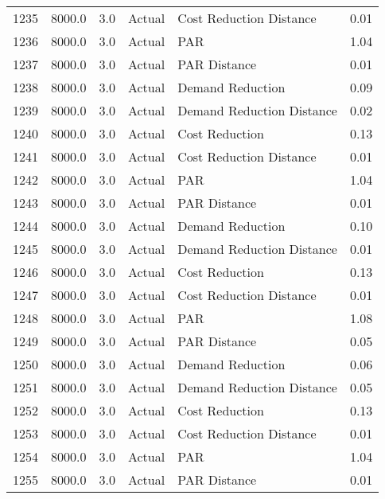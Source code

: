 \begin{longtable}{lrrllr}
1235 &       8000.0 &     3.0 &         Actual &    Cost Reduction Distance &   0.01 \\
1236 &       8000.0 &     3.0 &         Actual &                        PAR &   1.04 \\
1237 &       8000.0 &     3.0 &         Actual &               PAR Distance &   0.01 \\
1238 &       8000.0 &     3.0 &         Actual &           Demand Reduction &   0.09 \\
1239 &       8000.0 &     3.0 &         Actual &  Demand Reduction Distance &   0.02 \\
1240 &       8000.0 &     3.0 &         Actual &             Cost Reduction &   0.13 \\
1241 &       8000.0 &     3.0 &         Actual &    Cost Reduction Distance &   0.01 \\
1242 &       8000.0 &     3.0 &         Actual &                        PAR &   1.04 \\
1243 &       8000.0 &     3.0 &         Actual &               PAR Distance &   0.01 \\
1244 &       8000.0 &     3.0 &         Actual &           Demand Reduction &   0.10 \\
1245 &       8000.0 &     3.0 &         Actual &  Demand Reduction Distance &   0.01 \\
1246 &       8000.0 &     3.0 &         Actual &             Cost Reduction &   0.13 \\
1247 &       8000.0 &     3.0 &         Actual &    Cost Reduction Distance &   0.01 \\
1248 &       8000.0 &     3.0 &         Actual &                        PAR &   1.08 \\
1249 &       8000.0 &     3.0 &         Actual &               PAR Distance &   0.05 \\
1250 &       8000.0 &     3.0 &         Actual &           Demand Reduction &   0.06 \\
1251 &       8000.0 &     3.0 &         Actual &  Demand Reduction Distance &   0.05 \\
1252 &       8000.0 &     3.0 &         Actual &             Cost Reduction &   0.13 \\
1253 &       8000.0 &     3.0 &         Actual &    Cost Reduction Distance &   0.01 \\
1254 &       8000.0 &     3.0 &         Actual &                        PAR &   1.04 \\
1255 &       8000.0 &     3.0 &         Actual &               PAR Distance &   0.01 \\

\end{longtable}
